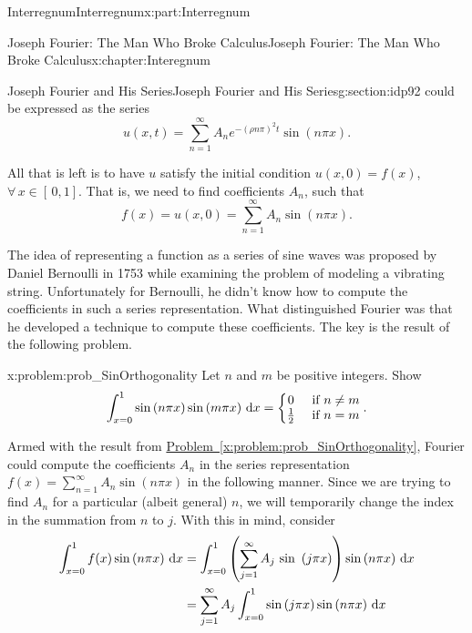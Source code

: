 \documentclass[oneside,10pt,]{book}
\newcommand{\xreffont}{\relax}
\numberwithin{equation}{section}
\newcommand{\dx}[1]{\,{\rm d}#1}
\newcommand{\amp}{&}
\begin{document}
\begin{partptx}{Interregnum}{}{Interregnum}{}{}{x:part:Interregnum}
\begin{chapterptx}{Joseph Fourier: The Man Who Broke Calculus}{}{Joseph Fourier: The Man Who Broke Calculus}{}{}{x:chapter:Interegnum}
\begin{sectionptx}{Joseph Fourier and His Series}{}{Joseph Fourier and His Series}{}{}{g:section:idp92}
could be expressed as the series%
\begin{equation*}
u(x,t)=\sum_{n=1}^\infty A_ne^{-(\rho n\pi)^2t}\sin\left(n\pi x\right)\text{.}
\end{equation*}
%
\par
All that is left is to have \(u\) satisfy the initial condition \(u(x,0)=f(x)\), \(\forall\,x\in[\,0,1]\). That is, we need to find coefficients \(A_n\), such that%
\begin{equation*}
f(x)=u(x,0)=\sum_{n=1}^\infty A_n\sin\left(n\pi x\right)\text{.}
\end{equation*}
%
\par
The idea of representing a function as a series of sine waves was proposed by Daniel Bernoulli in 1753 while examining the problem of modeling a vibrating string. Unfortunately for Bernoulli, he didn't know how to compute the coefficients in such a series representation. What distinguished Fourier was that he developed a technique to compute these coefficients. The key is the result of the following problem.%
\begin{problem}{}{x:problem:prob_SinOrthogonality}%
 Let \(n\) and \(m\) be positive integers. Show%
\begin{equation*}
\int_{x=0}^1\sin\left(n\pi x\right)\sin\left(m\pi x\right)\dx{ x}= \left\{\begin{matrix}0\amp \text{ if } n\neq m\\ \frac{1}{2}\amp \text{ if } n=m \end{matrix} \right.. {}
\end{equation*}
%
\end{problem}
Armed with the result from \hyperref[x:problem:prob_SinOrthogonality]{Problem~{\xreffont\ref{x:problem:prob_SinOrthogonality}}},  Fourier could compute the coefficients \(A_n\) in the series representation \(f(x)=\sum_{n=1}^\infty A_n \sin\left(n\pi x\right)\) in the following manner. Since we are trying to find \(A_n\) for a particular (albeit general) \(n\), we will temporarily change the index in the summation from \(n\) to \(j\). With this in mind, consider%
\begin{align*}
\int_{x=0}^1f(x)\sin\left(n\pi x\right)\dx{ x} \amp =\int_{x=0}^1\left(\sum_{j=1}^\infty A_j\text{ sin } \left(j\pi x\right)\right)\sin\left(n\pi x\right)\dx{ x}\\
\amp =\sum_{j=1}^\infty A_j\int_{x=0}^1\sin\left(j\pi x\right)\sin\left(n\pi x\right)\dx{ x}\\

\end{align*}
\end{sectionptx}
\end{chapterptx}
\end{partptx}
\end{document}

